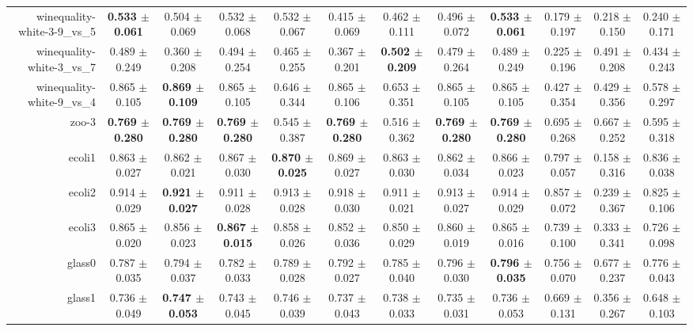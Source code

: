 \begin{table}[!ht]
{\begin{tabular}{r c c c c c c c c c c c}
winequality-white-3-9\_vs\_5 & \textbf{0.533 $\pm$ 0.061} & 0.504 $\pm$ 0.069 & 0.532 $\pm$ 0.068 & 0.532 $\pm$ 0.067 & 0.415 $\pm$ 0.069 & 0.462 $\pm$ 0.111 & 0.496 $\pm$ 0.072 & \textbf{0.533 $\pm$ 0.061} & 0.179 $\pm$ 0.197 & 0.218 $\pm$ 0.150 & 0.240 $\pm$ 0.171 \\
winequality-white-3\_vs\_7 & 0.489 $\pm$ 0.249 & 0.360 $\pm$ 0.208 & 0.494 $\pm$ 0.254 & 0.465 $\pm$ 0.255 & 0.367 $\pm$ 0.201 & \textbf{0.502 $\pm$ 0.209} & 0.479 $\pm$ 0.264 & 0.489 $\pm$ 0.249 & 0.225 $\pm$ 0.196 & 0.491 $\pm$ 0.208 & 0.434 $\pm$ 0.243 \\
winequality-white-9\_vs\_4 & 0.865 $\pm$ 0.105 & \textbf{0.869 $\pm$ 0.109} & 0.865 $\pm$ 0.105 & 0.646 $\pm$ 0.344 & 0.865 $\pm$ 0.106 & 0.653 $\pm$ 0.351 & 0.865 $\pm$ 0.105 & 0.865 $\pm$ 0.105 & 0.427 $\pm$ 0.354 & 0.429 $\pm$ 0.356 & 0.578 $\pm$ 0.297 \\
zoo-3 & \textbf{0.769 $\pm$ 0.280} & \textbf{0.769 $\pm$ 0.280} & \textbf{0.769 $\pm$ 0.280} & 0.545 $\pm$ 0.387 & \textbf{0.769 $\pm$ 0.280} & 0.516 $\pm$ 0.362 & \textbf{0.769 $\pm$ 0.280} & \textbf{0.769 $\pm$ 0.280} & 0.695 $\pm$ 0.268 & 0.667 $\pm$ 0.252 & 0.595 $\pm$ 0.318 \\
ecoli1 & 0.863 $\pm$ 0.027 & 0.862 $\pm$ 0.021 & 0.867 $\pm$ 0.030 & \textbf{0.870 $\pm$ 0.025} & 0.869 $\pm$ 0.027 & 0.863 $\pm$ 0.030 & 0.862 $\pm$ 0.034 & 0.866 $\pm$ 0.023 & 0.797 $\pm$ 0.057 & 0.158 $\pm$ 0.316 & 0.836 $\pm$ 0.038 \\
ecoli2 & 0.914 $\pm$ 0.029 & \textbf{0.921 $\pm$ 0.027} & 0.911 $\pm$ 0.028 & 0.913 $\pm$ 0.028 & 0.918 $\pm$ 0.030 & 0.911 $\pm$ 0.021 & 0.913 $\pm$ 0.027 & 0.914 $\pm$ 0.029 & 0.857 $\pm$ 0.072 & 0.239 $\pm$ 0.367 & 0.825 $\pm$ 0.106 \\
ecoli3 & 0.865 $\pm$ 0.020 & 0.856 $\pm$ 0.023 & \textbf{0.867 $\pm$ 0.015} & 0.858 $\pm$ 0.026 & 0.852 $\pm$ 0.036 & 0.850 $\pm$ 0.029 & 0.860 $\pm$ 0.019 & 0.865 $\pm$ 0.016 & 0.739 $\pm$ 0.100 & 0.333 $\pm$ 0.341 & 0.726 $\pm$ 0.098 \\
glass0 & 0.787 $\pm$ 0.035 & 0.794 $\pm$ 0.037 & 0.782 $\pm$ 0.033 & 0.789 $\pm$ 0.028 & 0.792 $\pm$ 0.027 & 0.785 $\pm$ 0.040 & 0.796 $\pm$ 0.030 & \textbf{0.796 $\pm$ 0.035} & 0.756 $\pm$ 0.070 & 0.677 $\pm$ 0.237 & 0.776 $\pm$ 0.043 \\
glass1 & 0.736 $\pm$ 0.049 & \textbf{0.747 $\pm$ 0.053} & 0.743 $\pm$ 0.045 & 0.746 $\pm$ 0.039 & 0.737 $\pm$ 0.043 & 0.738 $\pm$ 0.033 & 0.735 $\pm$ 0.031 & 0.736 $\pm$ 0.053 & 0.669 $\pm$ 0.131 & 0.356 $\pm$ 0.267 & 0.648 $\pm$ 0.103 \\

\end{tabular}}
\end{table}
